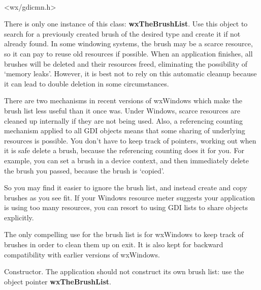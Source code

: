 
\\


<wx/gdicmn.h>


There is only one instance of this class: {\bf wxTheBrushList}.  Use
this object to search for a previously created brush of the desired
type and create it if not already found. In some windowing systems,
the brush may be a scarce resource, so it can pay to reuse old
resources if possible. When an application finishes, all brushes will
be deleted and their resources freed, eliminating the possibility of
`memory leaks'. However, it is best not to rely on this automatic
cleanup because it can lead to double deletion in some circumstances.

There are two mechanisms in recent versions of wxWindows which make the
brush list less useful than it once was. Under Windows, scarce resources
are cleaned up internally if they are not being used. Also, a referencing
counting mechanism applied to all GDI objects means that some sharing
of underlying resources is possible. You don't have to keep track of pointers,
working out when it is safe delete a brush, because the referencing counting does
it for you. For example, you can set a brush in a device context, and then
immediately delete the brush you passed, because the brush is `copied'.

So you may find it easier to ignore the brush list, and instead create
and copy brushes as you see fit. If your Windows resource meter suggests
your application is using too many resources, you can resort to using
GDI lists to share objects explicitly.

The only compelling use for the brush list is for wxWindows to keep
track of brushes in order to clean them up on exit. It is also kept for
backward compatibility with earlier versions of wxWindows.




\label{wxbrushlistconstr}


Constructor. The application should not construct its own brush list:
use the object pointer {\bf wxTheBrushList}.

